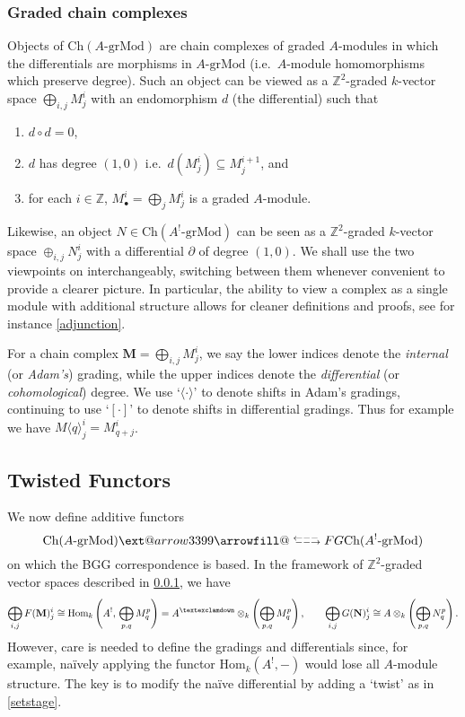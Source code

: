 \documentclass[a4paper]{article}
\makeatletter
\theoremstyle{definition}
\theoremstyle{remark}
\newcommand{\leftrarrows}{\mathrel{\raise.75ex\hbox{\oalign{%
  $\scriptstyle\leftarrow$\cr
  \vrule width0pt height.5ex$\hfil\scriptstyle\relbar$\cr}}}}
\newcommand{\lrightarrows}{\mathrel{\raise.75ex\hbox{\oalign{%
  $\scriptstyle\relbar$\hfil\cr
  $\scriptstyle\vrule width0pt height.5ex\smash\rightarrow$\cr}}}}
\newcommand{\Rrelbar}{\mathrel{\raise.75ex\hbox{\oalign{%
  $\scriptstyle\relbar$\cr
  \vrule width0pt height.5ex$\scriptstyle\relbar$}}}}
\def\leftrightarrowsfill@{\arrowfill@\leftrarrows\Rrelbar\lrightarrows}
\newcommand{\xleftrightarrows}[2][]{\ext@arrow 3399\leftrightarrowsfill@{#1}{#2}}
\newcommand{\grMod}{\ensuremath{\text{-grMod}}}
\newcommand{\Ch}{\ensuremath{\text{Ch}}}
\newcommand{\Hom}{\ensuremath{\text{Hom}}}
\newcommand{\gnab}{{\textexclamdown}}
\makeatother
\begin{document}
\subsubsection{Graded chain complexes}
\label{subsec-chaincomp}

Objects of \(\Ch(A\grMod)\) are chain complexes of graded \(A\)-modules in
which the differentials are morphisms in \(A\grMod\) (i.e.\ \(A\)-module
homomorphisms which preserve degree). Such an object can be viewed as a
\(\mathbb{Z}^2\)-graded \(k\)-vector space \(\bigoplus_{i,j}M^i_j\) with an
endomorphism \(d\) (the differential) such that 
\begin{enumerate}[]
    \item \(d\circ d=0\), 
    \item \(d\) has degree \((1,0)\) i.e.\ \(d(M^i_j)\subseteq M^{i+1}_j\),
        and
    \item for each \(i\in \mathbb{Z}\), \(M^i_\bullet = \bigoplus_{j}
        M^i_j\) is a graded \(A\)-module.  
\end{enumerate} 
Likewise, an object \(N\in \Ch(A^!\grMod)\) can be seen as a \(\mathbb{Z}^2\)-graded
\(k\)-vector space \(\oplus_{i,j}N^i_j\) with a differential \(\partial\) of
degree \((1,0)\). We shall use the two viewpoints on interchangeably, switching
between them whenever convenient to provide a clearer picture. In particular,
the ability to view a complex as a single module with additional structure
allows for cleaner definitions and proofs, see for instance \cref{adjunction}.

For a chain complex \(\mathbf{M}=\bigoplus_{i,j}M^i_j\), we say the lower
indices denote the \textit{internal} (or \textit{Adam's}) grading, while the
upper indices denote the \textit{differential} (or \textit{cohomological})
degree.  We use `\(\langle\cdot\rangle\)' to denote shifts in Adam's gradings,
continuing to use `\([\cdot]\)' to denote shifts in differential gradings.  Thus
for example we have \(M\langle q \rangle^i_j = M^i_{q+j}\).

\subsection{Twisted Functors}

We now define additive functors 
\[\Ch(A\grMod) \xleftrightarrows[F]{G} \Ch(A^!\grMod)\]
on which the BGG correspondence is based. In the framework of
\(\mathbb{Z}^2\)-graded vector spaces described in \cref{subsec-chaincomp}, we have 
\[\bigoplus_{i,j}F(\mathbf{M})^i_j \cong \Hom_{k}\left(A^!,\,
\bigoplus_{p,q}M^p_q\right) = A^\gnab \otimes_k
\left(\bigoplus_{p,q}M^p_q\right), \qquad \bigoplus_{i,j}G(\mathbf{N})^i_j \cong
A\otimes_k \left(\bigoplus_{p,q}N^p_q\right).\] 
However, care is needed to define the gradings and differentials since, for
example, na\"ively applying the functor \(\Hom_k(A^!,-)\) would lose all
\(A\)-module structure. The key is to modify the na\"ive differential by adding a
`twist' as in \cref{setstage}.
\end{document}
